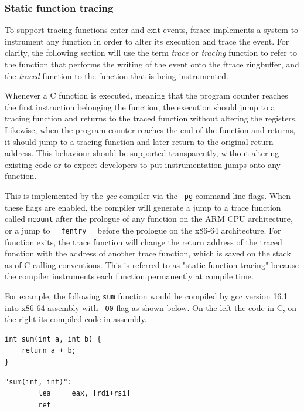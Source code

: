 \subsubsection*{Static function tracing}

To support tracing functions enter and exit events, ftrace implements a system
to instrument any function in order to alter its execution and trace the event.
For clarity, the following section will use the term \textit{trace} or
\textit{tracing} function to refer to the function that performs the writing of
the event onto the ftrace ringbuffer, and the \textit{traced} function to the
function that is being instrumented.

Whenever a C function is executed, meaning that the program counter reaches the
first instruction belonging the function, the execution should jump to a tracing
function and returns to the traced function without altering the registers.
Likewise, when the program counter reaches the end of the function and returns,
it should jump to a tracing function and later return to the original return
address. This behaviour should be supported transparently, without altering
existing code or to expect developers to put instrumentation jumps onto any
function.

This is implemented by the \textit{gcc} compiler via the \verb|-pg| command line
flags. When these flags are enabled, the compiler will generate a jump to a
trace function called \verb|mcount| after the prologue of any function on the
ARM CPU architecture, or a jump to \verb|__fentry__| before the prologue on the
x86-64 architecture. For function exits, the trace function will change the
return address of the traced function with the address of another trace
function, which is saved on the stack as of C calling conventions. This is
referred to as "static function tracing" because the compiler instruments each
function permanently at compile time.

For example, the following \verb|sum| function would be compiled by gcc version
16.1 into x86-64 assembly with \verb|-O0| flag as shown below. On the left the
code in C, on the right its compiled code in assembly.

\noindent
\vspace{0.5em}

\begin{minipage}[t]{0.47\textwidth}
\begin{verbatim}
int sum(int a, int b) {
    return a + b;
}
\end{verbatim}
\end{minipage}%
\hfill
\vrule %
\hfill
\begin{minipage}[t]{0.47\textwidth}
\begin{verbatim}
"sum(int, int)":
        lea     eax, [rdi+rsi]
        ret
\end{verbatim}
\end{minipage}

